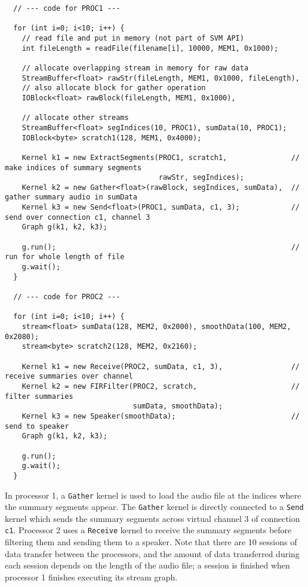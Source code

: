 {\small
\begin{verbatim}
  // --- code for PROC1 ---

  for (int i=0; i<10; i++) {
    // read file and put in memory (not part of SVM API)
    int fileLength = readFile(filename[i], 10000, MEM1, 0x1000);

    // allocate overlapping stream in memory for raw data
    StreamBuffer<float> rawStr(fileLength, MEM1, 0x1000, fileLength), 
    // also allocate block for gather operation
    IOBlock<float> rawBlock(fileLength, MEM1, 0x1000), 

    // allocate other streams
    StreamBuffer<float> segIndices(10, PROC1), sumData(10, PROC1);
    IOBlock<byte> scratch1(128, MEM1, 0x4000);

    Kernel k1 = new ExtractSegments(PROC1, scratch1,               // make indices of summary segments
                                    rawStr, segIndices);
    Kernel k2 = new Gather<float>(rawBlock, segIndices, sumData),  // gather summary audio in sumData
    Kernel k3 = new Send<float>(PROC1, sumData, c1, 3);            // send over connection c1, channel 3
    Graph g(k1, k2, k3);
            
    g.run();                                                       // run for whole length of file
    g.wait();
  }

  // --- code for PROC2 ---

  for (int i=0; i<10; i++) {
    stream<float> sumData(128, MEM2, 0x2000), smoothData(100, MEM2, 0x2080);
    stream<byte> scratch2(128, MEM2, 0x2160);

    Kernel k1 = new Receive(PROC2, sumData, c1, 3),                // receive summaries over channel
    Kernel k2 = new FIRFilter(PROC2, scratch,                      // filter summaries
                              sumData, smoothData);
    Kernel k3 = new Speaker(smoothData);                           // send to speaker
    Graph g(k1, k2, k3);

    g.run();
    g.wait();
  }   
\end{verbatim}}
In processor 1, a {\tt Gather} kernel is used to load the audio file
at the indices where the summary segments appear.  The {\tt Gather}
kernel is directly connected to a {\tt Send} kernel which sends the
summary segments across virtual channel 3 of connection {\tt c1}.
Processor 2 uses a {\tt Receive} kernel to receive the summary
segments before filtering them and sending them to a speaker.  Note
that there are 10 sessions of data transfer between the processors,
and the amount of data transferred during each session depends on the
length of the audio file; a session is finished when processor 1
finishes executing its stream graph.

